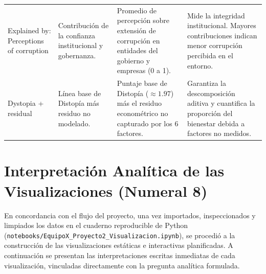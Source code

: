 \documentclass[11pt]{article}
\begin{document}
\begin{xltabular}{\textwidth}{>{\bfseries\raggedright\arraybackslash}p{2.8cm} >{\raggedright\arraybackslash}p{3.5cm} >{\raggedright\arraybackslash}p{3.5cm} >{\raggedright\arraybackslash}X}
\addlinespace[3pt]
Explained by: Perceptions of corruption & Contribución de la confianza institucional y gobernanza. & Promedio de percepción sobre extensión de corrupción en entidades del gobierno y empresas (0 a 1). & Mide la integridad institucional. Mayores contribuciones indican menor corrupción percibida en el entorno. \\
\addlinespace[3pt]
Dystopia + residual & Línea base de Distopía más residuo no modelado. & Puntaje base de Distopía ($\approx 1.97$) más el residuo econométrico no capturado por los 6 factores. & Garantiza la descomposición aditiva y cuantifica la proporción del bienestar debida a factores no medidos. \\
\end{xltabular}

\vspace{0.6em}

\section{Interpretación Analítica de las Visualizaciones (Numeral 8)}

En concordancia con el flujo del proyecto, una vez importados, inspeccionados y limpiados los datos en el cuaderno reproducible de Python (\texttt{notebooks/EquipoX\_Proyecto2\_Visualizacion.ipynb}), se procedió a la construcción de las visualizaciones estáticas e interactivas planificadas. A continuación se presentan las interpretaciones escritas inmediatas de cada visualización, vinculadas directamente con la pregunta analítica formulada.
\end{document}
